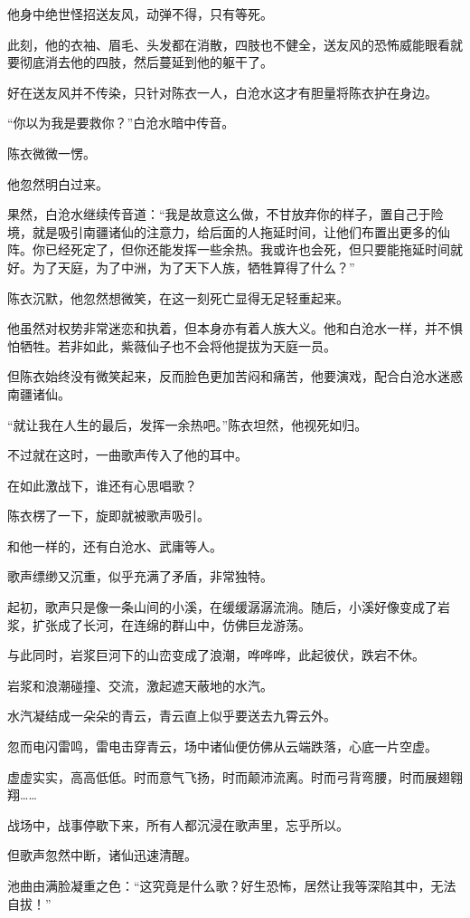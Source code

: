 \begin{this_body}
他身中绝世怪招送友风，动弹不得，只有等死。

此刻，他的衣袖、眉毛、头发都在消散，四肢也不健全，送友风的恐怖威能眼看就要彻底消去他的四肢，然后蔓延到他的躯干了。

好在送友风并不传染，只针对陈衣一人，白沧水这才有胆量将陈衣护在身边。

“你以为我是要救你？”白沧水暗中传音。

陈衣微微一愣。

他忽然明白过来。

果然，白沧水继续传音道：“我是故意这么做，不甘放弃你的样子，置自己于险境，就是吸引南疆诸仙的注意力，给后面的人拖延时间，让他们布置出更多的仙阵。你已经死定了，但你还能发挥一些余热。我或许也会死，但只要能拖延时间就好。为了天庭，为了中洲，为了天下人族，牺牲算得了什么？”

陈衣沉默，他忽然想微笑，在这一刻死亡显得无足轻重起来。

他虽然对权势非常迷恋和执着，但本身亦有着人族大义。他和白沧水一样，并不惧怕牺牲。若非如此，紫薇仙子也不会将他提拔为天庭一员。

但陈衣始终没有微笑起来，反而脸色更加苦闷和痛苦，他要演戏，配合白沧水迷惑南疆诸仙。

“就让我在人生的最后，发挥一余热吧。”陈衣坦然，他视死如归。

不过就在这时，一曲歌声传入了他的耳中。

在如此激战下，谁还有心思唱歌？

陈衣楞了一下，旋即就被歌声吸引。

和他一样的，还有白沧水、武庸等人。

歌声缥缈又沉重，似乎充满了矛盾，非常独特。

起初，歌声只是像一条山间的小溪，在缓缓潺潺流淌。随后，小溪好像变成了岩浆，扩张成了长河，在连绵的群山中，仿佛巨龙游荡。

与此同时，岩浆巨河下的山峦变成了浪潮，哗哗哗，此起彼伏，跌宕不休。

岩浆和浪潮碰撞、交流，激起遮天蔽地的水汽。

水汽凝结成一朵朵的青云，青云直上似乎要送去九霄云外。

忽而电闪雷鸣，雷电击穿青云，场中诸仙便仿佛从云端跌落，心底一片空虚。

虚虚实实，高高低低。时而意气飞扬，时而颠沛流离。时而弓背弯腰，时而展翅翱翔……

战场中，战事停歇下来，所有人都沉浸在歌声里，忘乎所以。

但歌声忽然中断，诸仙迅速清醒。

池曲由满脸凝重之色：“这究竟是什么歌？好生恐怖，居然让我等深陷其中，无法自拔！”


\end{this_body}
